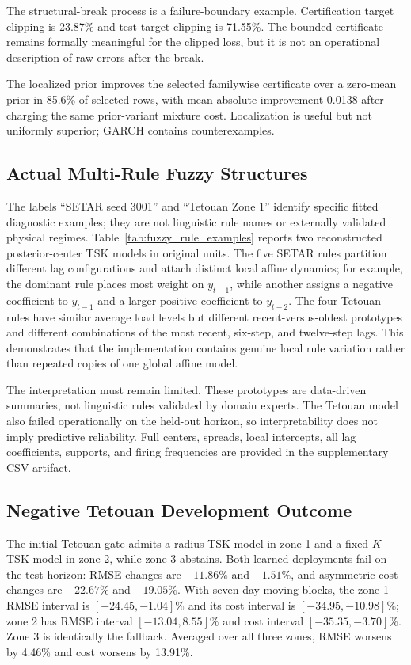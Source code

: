 The structural-break process is a failure-boundary example. Certification target clipping is 23.87\% and test target clipping is 71.55\%. The bounded certificate remains formally meaningful for the clipped loss, but it is not an operational description of raw errors after the break.

The localized prior improves the selected familywise certificate over a zero-mean prior in 85.6\% of selected rows, with mean absolute improvement 0.0138 after charging the same prior-variant mixture cost. Localization is useful but not uniformly superior; GARCH contains counterexamples.

\subsection{Actual Multi-Rule Fuzzy Structures}

The labels ``SETAR seed 3001'' and ``Tetouan Zone 1'' identify specific fitted diagnostic examples; they are not linguistic rule names or externally validated physical regimes.
Table~\ref{tab:fuzzy_rule_examples} reports two reconstructed posterior-center TSK models in original units. The five SETAR rules partition different lag configurations and attach distinct local affine dynamics; for example, the dominant rule places most weight on $y_{t-1}$, while another assigns a negative coefficient to $y_{t-1}$ and a larger positive coefficient to $y_{t-2}$. The four Tetouan rules have similar average load levels but different recent-versus-oldest prototypes and different combinations of the most recent, six-step, and twelve-step lags. This demonstrates that the implementation contains genuine local rule variation rather than repeated copies of one global affine model.

The interpretation must remain limited. These prototypes are data-driven summaries, not linguistic rules validated by domain experts. The Tetouan model also failed operationally on the held-out horizon, so interpretability does not imply predictive reliability. Full centers, spreads, local intercepts, all lag coefficients, supports, and firing frequencies are provided in the supplementary CSV artifact.

\subsection{Negative Tetouan Development Outcome}
The initial Tetouan gate admits a radius TSK model in zone 1 and a fixed-$K$ TSK model in zone 2, while zone 3 abstains. Both learned deployments fail on the test horizon: RMSE changes are $-11.86\%$ and $-1.51\%$, and asymmetric-cost changes are $-22.67\%$ and $-19.05\%$. With seven-day moving blocks, the zone-1 RMSE interval is $[-24.45,-1.04]\%$ and its cost interval is $[-34.95,-10.98]\%$; zone 2 has RMSE interval $[-13.04,8.55]\%$ and cost interval $[-35.35,-3.70]\%$. Zone 3 is identically the fallback. Averaged over all three zones, RMSE worsens by 4.46\% and cost worsens by 13.91\%.

